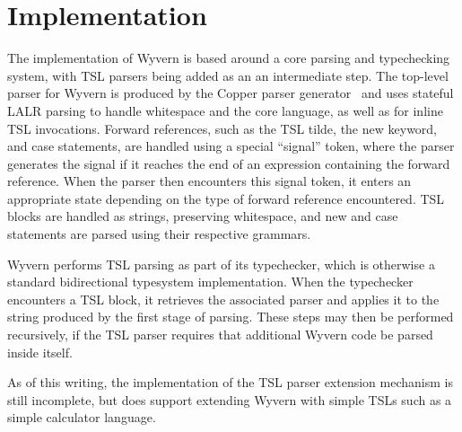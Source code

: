 
\section{Implementation}
\label{s:implementation}
The implementation of Wyvern is based around a core parsing and typechecking system, with TSL parsers being added as an an intermediate step. The top-level parser for Wyvern is produced by the Copper parser generator~\cite{van2007context}
and uses stateful LALR parsing to handle whitespace and the core language, as well as for inline TSL invocations. Forward references, such as the TSL tilde, the new keyword, and case statements, are handled using a special ``signal'' token, where the parser generates the signal if it reaches the end of an expression containing the forward reference. When the parser then encounters this signal token, it enters an appropriate state depending on the type of forward reference encountered. TSL blocks are handled as strings, preserving whitespace, and new and case statements are parsed using their respective grammars. 

Wyvern performs TSL parsing as part of its typechecker, which is otherwise a standard bidirectional typesystem implementation. When the typechecker encounters a TSL block, it retrieves the associated parser and applies it to the string produced by the first stage of parsing. These steps may then be performed recursively, if the TSL parser requires that additional Wyvern code be parsed inside itself. 

As of this writing, the implementation of the TSL parser extension mechanism is still incomplete, but does support extending Wyvern with simple TSLs such as a simple calculator language. 